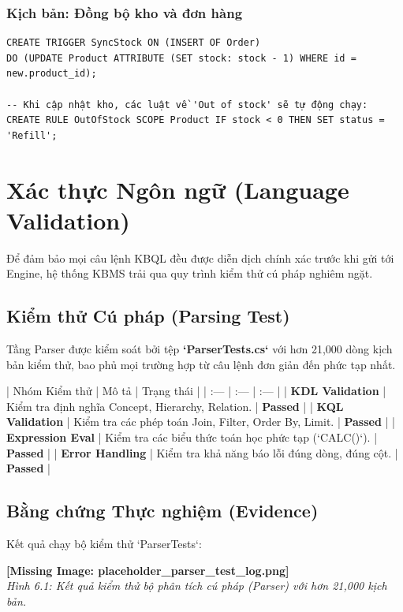 \subsubsection{Kịch bản: Đồng bộ kho và đơn hàng}
\begin{verbatim}
CREATE TRIGGER SyncStock ON (INSERT OF Order) 
DO (UPDATE Product ATTRIBUTE (SET stock: stock - 1) WHERE id = new.product_id);

-- Khi cập nhật kho, các luật về 'Out of stock' sẽ tự động chạy:
CREATE RULE OutOfStock SCOPE Product IF stock < 0 THEN SET status = 'Refill';
\end{verbatim}

\section{Xác thực Ngôn ngữ (Language Validation)}

Để đảm bảo mọi câu lệnh KBQL đều được diễn dịch chính xác trước khi gửi tới Engine, hệ thống KBMS trải qua quy trình kiểm thử cú pháp nghiêm ngặt.

\subsection{Kiểm thử Cú pháp (Parsing Test)}

Tầng Parser được kiểm soát bởi tệp \textbf{`ParserTests.cs`} với hơn 21,000 dòng kịch bản kiểm thử, bao phủ mọi trường hợp từ câu lệnh đơn giản đến phức tạp nhất.

| Nhóm Kiểm thử | Mô tả | Trạng thái |
| :--- | :--- | :--- |
| \textbf{KDL Validation} | Kiểm tra định nghĩa Concept, Hierarchy, Relation. | \textbf{Passed} |
| \textbf{KQL Validation} | Kiểm tra các phép toán Join, Filter, Order By, Limit. | \textbf{Passed} |
| \textbf{Expression Eval} | Kiểm tra các biểu thức toán học phức tạp (`CALC()`). | \textbf{Passed} |
| \textbf{Error Handling} | Kiểm tra khả năng báo lỗi đúng dòng, đúng cột. | \textbf{Passed} |

\subsection{Bằng chứng Thực nghiệm (Evidence)}

Kết quả chạy bộ kiểm thử `ParserTests`:

\textbf{[Missing Image: placeholder_parser_test_log.png]}\\ \textit{Hình 6.1: Kết quả kiểm thử bộ phân tích cú pháp (Parser) với hơn 21,000 kịch bản.}

